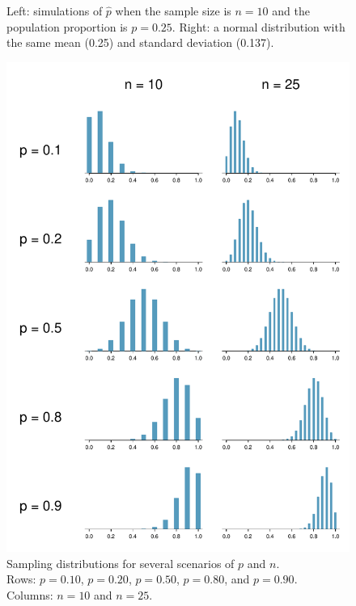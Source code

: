 \begin{figure}[h]
   \centering
   \caption{Left: simulations of $\hat{p}$ when the sample size
       is $n = 10$ and the population proportion is $p = 0.25$.
       Right: a normal distribution with the same mean (0.25)
       and standard deviation (0.137).}
   \label{sampling_10_prop_25p}
\end{figure}

\begin{figure}
   \centering
   \includegraphics[width=\textwidth]{ch_distributions/figures/clt_prop_grid/clt_prop_grid_1}
   \caption{Sampling distributions for several scenarios
       of $p$ and $n$. \\
       Rows: $p = 0.10$, $p = 0.20$, $p = 0.50$,
       $p = 0.80$, and $p = 0.90$. \\
       Columns: $n = 10$ and $n = 25$.}
   \label{clt_prop_grid_1}
\end{figure}

